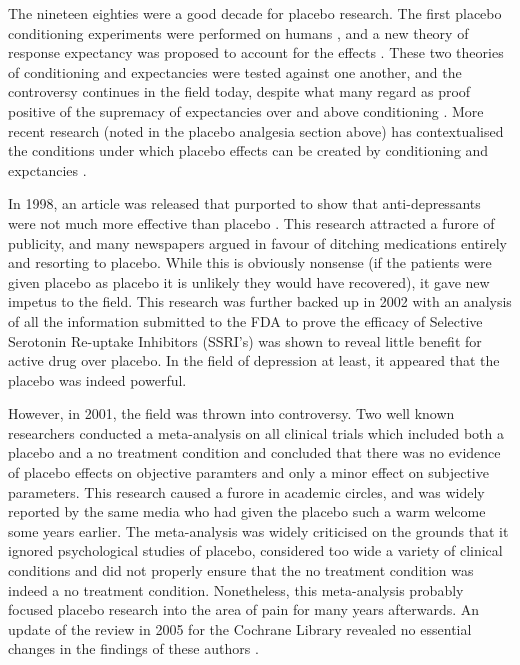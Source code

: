The nineteen eighties were a good decade for placebo research. The first placebo conditioning experiments were performed on humans \cite{Voudouris1985}, and a new theory of response expectancy was proposed to account for the effects \cite{Kirsch1985}. These two theories of conditioning and expectancies were tested against one another, and the controversy continues in the field today, despite what many regard as proof positive of the supremacy of expectancies over and above conditioning \cite{Montgomery1997}. More recent research (noted in the placebo analgesia section above) has contextualised the conditions under which placebo effects can be created by conditioning and expctancies \cite{Benedetti2003a}. 

In 1998, an article was released that purported to show that anti-depressants were not much more effective than placebo \cite{Kirsch1998}. This research attracted a furore of publicity, and many newspapers argued in favour of ditching medications entirely and resorting to placebo. While this is obviously nonsense (if the patients were given placebo as placebo it is unlikely they would have recovered), it gave new impetus to the field. This research was further backed up in 2002 \cite{Kirsch2002a}  with an analysis of all the information submitted to the FDA to prove the efficacy of Selective Serotonin Re-uptake Inhibitors (SSRI's) was shown to reveal little benefit for active drug over placebo. In the field of depression at least, it appeared that the placebo was indeed powerful. 

However, in 2001, the field was thrown into controversy. Two well known researchers conducted a meta-analysis on all clinical trials which included both a placebo and a no treatment condition \cite{hrobjartsson2001placebo}  and concluded that there was no evidence of placebo effects on objective paramters and only a minor effect on subjective parameters. This research caused a furore in academic circles, and was widely reported by the same media who had given the placebo such a warm welcome some years earlier. The meta-analysis was widely criticised \cite{Evans2003,Kirsch2001,Wickramasekera2001,Greene2001}  on the grounds that it ignored psychological studies of placebo, considered too wide a variety of clinical conditions and did not properly ensure that the no treatment condition was indeed a no treatment condition. Nonetheless, this meta-analysis probably focused placebo research into the area of pain for many years afterwards. An update of the review in 2005 for the Cochrane Library revealed no essential changes in the findings of these authors \cite{Hrobjartsson2004}. 

